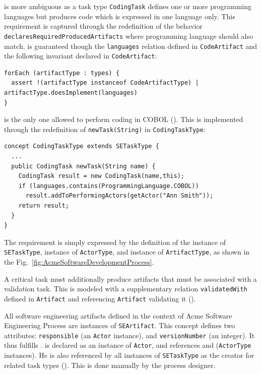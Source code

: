  is more ambiguous as a task type \texttt{CodingTask} defines one or
more programming languages but produces code which is expressed in one language
only. This requirement is captured through the redefinition of the behavior
\texttt{declaresRequiredProducedArtifacts} where programming language should
also match.   is guaranteed though the \texttt{languages} relation
defined in \texttt{CodeArtifact} and the following invariant declared in
\texttt{CodeArtifact}:
\begin{lstlisting}
forEach (artifactType : types) {
  assert !(artifactType instanceof CodeArtifactType) | artifactType.doesImplement(languages)
}
\end{lstlisting}

 is the only one allowed to perform coding in COBOL (). This is implemented through the redefinition of \texttt{newTask(String)} in \texttt{CodingTaskType}:

\begin{lstlisting}
concept CodingTaskType extends SETaskType {
  ...
  public CodingTask newTask(String name) {
    CodingTask result = new CodingTask(name,this);
    if (languages.contains(ProgrammingLanguage.COBOL))
      result.addToPerformingActors(getActor("Ann Smith"));
    return result;
  }
}
\end{lstlisting}

The requirement  is simply expressed by the definition of the
 instance of \texttt{SETaskType},  instance of
\texttt{ActorType}, and  instance of \texttt{ArtifactType},
as shown in the Fig.~\ref{fig:AcmeSoftwareDevelopmentProcess}.

A critical task must additionally produce artifacts that must be associated
with a validation task. This is modeled with a supplementary relation
\texttt{validatedWith} defined in \texttt{Artifact} and referencing
\texttt{Artifact} validating it ().

All software engineering artifacts defined in the context of Acme Software
Engineering Process are  instances of \texttt{SEArtifact}. This concept defines
two attributes: \texttt{responsible} (an \texttt{Actor} instance), and
\texttt{versionNumber} (an integer). It thus fulfills .  is declared as an instance of \texttt{Actor}, and references
 and  (\texttt{ActorType} instances). He is also
referenced by all instances of \texttt{SETaskType} as the creator for related
task types (). This is done manually by the process designer.


